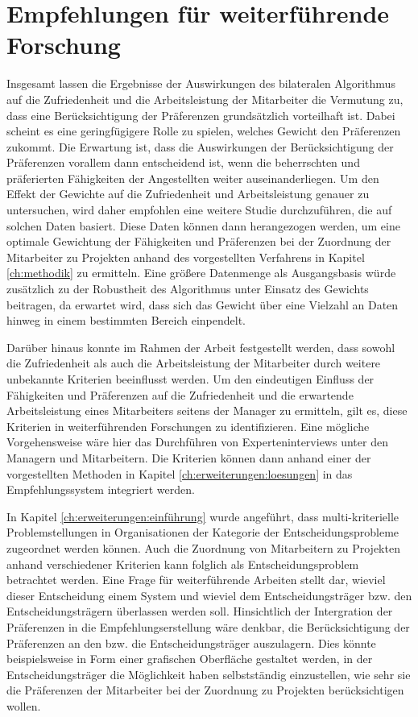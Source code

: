 \section{Empfehlungen für weiterführende Forschung}
Insgesamt lassen die Ergebnisse der Auswirkungen des bilateralen Algorithmus auf die Zufriedenheit und die Arbeitsleistung der Mitarbeiter die Vermutung zu, dass eine Berücksichtigung der Präferenzen grundsätzlich vorteilhaft ist.
Dabei scheint es eine geringfügigere Rolle zu spielen, welches Gewicht den Präferenzen zukommt.
Die Erwartung ist, dass die Auswirkungen der Berücksichtigung der Präferenzen vorallem dann entscheidend ist, wenn die beherrschten und präferierten Fähigkeiten der Angestellten weiter auseinanderliegen.
Um den Effekt der Gewichte auf die Zufriedenheit und Arbeitsleistung genauer zu untersuchen, wird daher empfohlen eine weitere Studie durchzuführen, die auf solchen Daten basiert.
Diese Daten können dann herangezogen werden, um eine optimale Gewichtung der Fähigkeiten und Präferenzen bei der Zuordnung der Mitarbeiter zu Projekten anhand des vorgestellten Verfahrens in Kapitel \ref{ch:methodik} zu ermitteln.
Eine größere Datenmenge als Ausgangsbasis würde zusätzlich zu der Robustheit des Algorithmus unter Einsatz des Gewichts beitragen, da erwartet wird, dass sich das Gewicht über eine Vielzahl an Daten hinweg in einem bestimmten Bereich einpendelt.

Darüber hinaus konnte im Rahmen der Arbeit festgestellt werden, dass sowohl die Zufriedenheit als auch die Arbeitsleistung der Mitarbeiter durch weitere unbekannte Kriterien beeinflusst werden.
Um den eindeutigen Einfluss der Fähigkeiten und Präferenzen auf die Zufriedenheit und die erwartende Arbeitsleistung eines Mitarbeiters seitens der Manager zu ermitteln, gilt es, diese Kriterien in weiterführenden Forschungen zu identifizieren.
Eine mögliche Vorgehensweise wäre hier das Durchführen von Experteninterviews unter den Managern und Mitarbeitern.
Die Kriterien können dann anhand einer der vorgestellten Methoden in Kapitel \ref{ch:erweiterungen:loesungen} in das Empfehlungssystem integriert werden.

In Kapitel \ref{ch:erweiterungen:einführung} wurde angeführt, dass multi-kriterielle Problemstellungen in Organisationen der Kategorie der Entscheidungsprobleme zugeordnet werden können.
Auch die Zuordnung von Mitarbeitern zu Projekten anhand verschiedener Kriterien kann folglich als Entscheidungsproblem betrachtet werden.
Eine Frage für weiterführende Arbeiten stellt dar, wieviel dieser Entscheidung einem System und wieviel dem Entscheidungsträger bzw. den Entscheidungsträgern überlassen werden soll.
Hinsichtlich der Intergration der Präferenzen in die Empfehlungserstellung wäre denkbar, die Berücksichtigung der Präferenzen an den bzw. die Entscheidungsträger auszulagern.
Dies könnte beispielsweise in Form einer grafischen Oberfläche gestaltet werden, in der Entscheidungsträger die Möglichkeit haben selbstständig einzustellen, wie sehr sie die Präferenzen der Mitarbeiter bei der Zuordnung zu Projekten berücksichtigen wollen.

